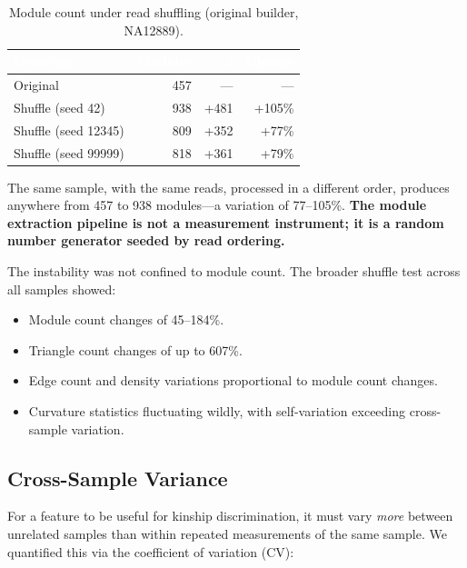 \documentclass{../yalumba}
\begin{document}
\begin{table}[H]
\centering
\caption{Module count under read shuffling (original builder, NA12889).}
\label{tab:shuffle-modules}
\begin{tabular}{lrrr}
\toprule
\rowcolor{table-header}
\textcolor{white}{\textbf{Ordering}} & \textcolor{white}{\textbf{Modules}} & \textcolor{white}{$\Delta$} & \textcolor{white}{\textbf{Change}} \\
\midrule
Original          & 457 & ---   & --- \\
Shuffle (seed 42)    & 938 & +481 & +105\% \\
Shuffle (seed 12345) & 809 & +352 & +77\% \\
Shuffle (seed 99999) & 818 & +361 & +79\% \\
\bottomrule
\end{tabular}
\end{table}

\begin{keyfinding}
The same sample, with the same reads, processed in a different order, produces
anywhere from 457 to 938 modules---a variation of 77--105\%. \textbf{The module
extraction pipeline is not a measurement instrument; it is a random number
generator seeded by read ordering.}
\end{keyfinding}

The instability was not confined to module count. The broader shuffle test
across all samples showed:

\begin{itemize}[leftmargin=2em]
  \item Module count changes of 45--184\%.
  \item Triangle count changes of up to 607\%.
  \item Edge count and density variations proportional to module count changes.
  \item Curvature statistics fluctuating wildly, with self-variation exceeding
    cross-sample variation.
\end{itemize}

\subsection{Cross-Sample Variance}

For a feature to be useful for kinship discrimination, it must vary \textit{more}
between unrelated samples than within repeated measurements of the same sample.
We quantified this via the coefficient of variation (CV):
\end{document}

